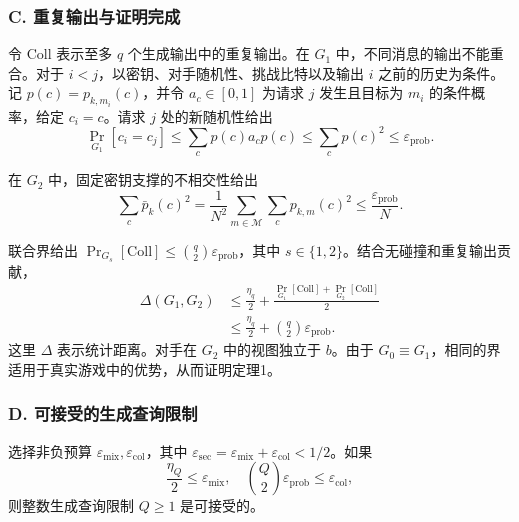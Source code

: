 \subsubsection*{C. 重复输出与证明完成}

令 \(\mathrm{Coll}\) 表示至多 \(q\) 个生成输出中的重复输出。在 \(G_1\) 中，不同消息的输出不能重合。对于 \(i < j\)，以密钥、对手随机性、挑战比特以及输出 \(i\) 之前的历史为条件。记 \(p(c) = p_{k,m_i}(c)\)，并令 \(a_c \in [0,1]\) 为请求 \(j\) 发生且目标为 \(m_i\) 的条件概率，给定 \(c_i = c\)。请求 \(j\) 处的新随机性给出
\begin{equation}
\Pr_{G_1}[c_i = c_j] \le \sum_c p(c) a_c p(c) \le \sum_c p(c)^2 \le \varepsilon_{\mathrm{prob}}. \tag{40}
\end{equation}

在 \(G_2\) 中，固定密钥支撑的不相交性给出
\begin{equation}
\sum_c \bar{p}_k(c)^2 = \frac{1}{N^2} \sum_{m \in \mathcal{M}} \sum_c p_{k,m}(c)^2 \le \frac{\varepsilon_{\mathrm{prob}}}{N}. \tag{41}
\end{equation}

联合界给出 \(\Pr_{G_s}[\mathrm{Coll}] \le \binom{q}{2} \varepsilon_{\mathrm{prob}}\)，其中 \(s \in \{1,2\}\)。结合无碰撞和重复输出贡献，
\begin{equation}
\begin{aligned}
\Delta(G_1, G_2) &\le \frac{\eta_q}{2} + \frac{\Pr_{G_1}[\mathrm{Coll}] + \Pr_{G_2}[\mathrm{Coll}]}{2} \\
&\le \frac{\eta_q}{2} + \binom{q}{2} \varepsilon_{\mathrm{prob}}.
\end{aligned} \tag{42}
\end{equation}
这里 \(\Delta\) 表示统计距离。对手在 \(G_2\) 中的视图独立于 \(b\)。由于 \(G_0 \equiv G_1\)，相同的界适用于真实游戏中的优势，从而证明定理1。

\subsubsection*{D. 可接受的生成查询限制}

选择非负预算 \(\varepsilon_{\mathrm{mix}}, \varepsilon_{\mathrm{col}}\)，其中 \(\varepsilon_{\mathrm{sec}} = \varepsilon_{\mathrm{mix}} + \varepsilon_{\mathrm{col}} < 1/2\)。如果
\begin{equation}
\frac{\eta_Q}{2} \le \varepsilon_{\mathrm{mix}}, \quad \binom{Q}{2} \varepsilon_{\mathrm{prob}} \le \varepsilon_{\mathrm{col}}, \tag{43}
\end{equation}
则整数生成查询限制 \(Q \ge 1\) 是可接受的。

